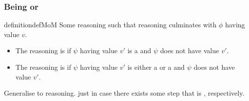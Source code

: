 \subsubsection{Being \mistaken{} or \misled{}}

\begin{note}
  \begin{restatable}{definition}{defMoM}\label{def:MoM}
    Some reasoning such that reasoning culminates with \(\phi\) having value \(v\).
    \begin{itemize}
      \item The reasoning is \emph{\mistaken{}} if \(\psi\) having value \(v'\) is a \prequ{} and \(\psi\) does not have value \(v'\).
    \item The reasoning is \emph{\misled{}} if \(\psi\) having value \(v'\) is either a \crequ{} or a \cprequ{} and \(\psi\) does not have value \(v'\).
    \end{itemize}
    \vspace{-\baselineskip}
  \end{restatable}

  Generalise to reasoning.
  \mom{} just in case there exists some step that is \mom{}, respectively.
\end{note}

